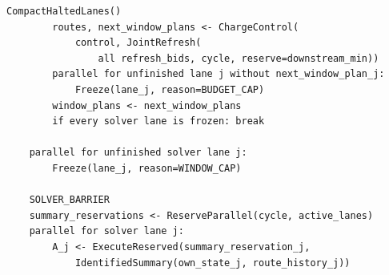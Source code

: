 \documentclass[10pt,a4paper]{article}
\begin{document}
\begin{lstlisting}[caption={Budgeted dispatch and state-isolated parallel solving.},label={lst:dispatch}]
        CompactHaltedLanes()
        routes, next_window_plans <- ChargeControl(
            control, JointRefresh(
                all refresh_bids, cycle, reserve=downstream_min))
        parallel for unfinished lane j without next_window_plan_j:
            Freeze(lane_j, reason=BUDGET_CAP)
        window_plans <- next_window_plans
        if every solver lane is frozen: break

    parallel for unfinished solver lane j:
        Freeze(lane_j, reason=WINDOW_CAP)

    SOLVER_BARRIER
    summary_reservations <- ReserveParallel(cycle, active_lanes)
    parallel for solver lane j:
        A_j <- ExecuteReserved(summary_reservation_j,
            IdentifiedSummary(own_state_j, route_history_j))
\end{lstlisting}
\end{document}
